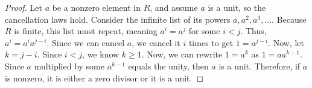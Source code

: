 \documentclass[12pt, oneside]{book}
\newcommand{\pf}[1]{
    \begin{customframedproof}[linecolor=orangehdx!75]
        \begin{proof}
        #1
        \end{proof}
    \end{customframedproof}
}
\begin{document}
\begin{enumerate}
    \pf{
        Let \(a\) be a nonzero element in \(R\), and assume \(a\) is a unit, so the cancellation laws hold. Consider the infinite list of its powers \(a, a^{2}, a^{3}, \dots\).  Because \(R\) is finite, this list must repeat, meaning \(a^{i} = a^{j}\) for some \(i < j\). Thus, \(a^{i} = a^{i}a^{j - i}\). Since we can cancel \(a\), we cancel it \(i\) times to get \(1 = a^{j - i}\). Now, let \(k = j - i\). Since \(i < j\), we know \(k \ge 1\). Now, we can rewrite \(1 = a^{k}\) as \(1 = aa^{k - 1}\). Since \(a\) multiplied by some \(a^{k-1}\) equals the unity, then \(a\) is a unit. Therefore, if \(a\) is nonzero, it is either a zero divisor or it is a unit.
    }
\end{enumerate}

\end{document}
